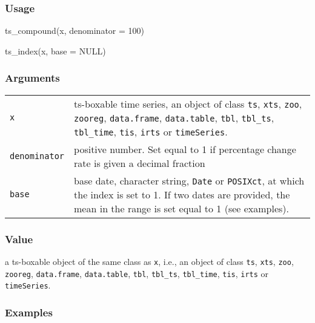 \documentclass[
  letterpaper,
  DIV=11,
  numbers=noendperiod]{scrreport}
\newenvironment{Shaded}{\begin{snugshade}}{\end{snugshade}}
\newcommand{\AttributeTok}[1]{\textcolor[rgb]{0.40,0.45,0.13}{#1}}
\newcommand{\ConstantTok}[1]{\textcolor[rgb]{0.56,0.35,0.01}{#1}}
\newcommand{\DecValTok}[1]{\textcolor[rgb]{0.68,0.00,0.00}{#1}}
\newcommand{\FunctionTok}[1]{\textcolor[rgb]{0.28,0.35,0.67}{#1}}
\newcommand{\NormalTok}[1]{\textcolor[rgb]{0.00,0.23,0.31}{#1}}
\begin{document}
\subsubsection{Usage}\label{usage-35}

\begin{Shaded}
\begin{Highlighting}[]
\FunctionTok{ts\_compound}\NormalTok{(x, }\AttributeTok{denominator =} \DecValTok{100}\NormalTok{)}

\FunctionTok{ts\_index}\NormalTok{(x, }\AttributeTok{base =} \ConstantTok{NULL}\NormalTok{)}
\end{Highlighting}
\end{Shaded}

\subsubsection{Arguments}\label{arguments-35}

\begin{longtable}[]{@{}ll@{}}
\toprule\noalign{}
\endhead
\bottomrule\noalign{}
\endlastfoot
\texttt{x} & ts-boxable time series, an object of class \texttt{ts},
\texttt{xts}, \texttt{zoo}, \texttt{zooreg}, \texttt{data.frame},
\texttt{data.table}, \texttt{tbl}, \texttt{tbl\_ts}, \texttt{tbl\_time},
\texttt{tis}, \texttt{irts} or \texttt{timeSeries}. \\
\texttt{denominator} & positive number. Set equal to 1 if percentage
change rate is given a decimal fraction \\
\texttt{base} & base date, character string, \texttt{Date} or
\texttt{POSIXct}, at which the index is set to 1. If two dates are
provided, the mean in the range is set equal to 1 (see examples). \\
\end{longtable}

\subsubsection{Value}\label{value-35}

a ts-boxable object of the same class as \texttt{x}, i.e., an object of
class \texttt{ts}, \texttt{xts}, \texttt{zoo}, \texttt{zooreg},
\texttt{data.frame}, \texttt{data.table}, \texttt{tbl},
\texttt{tbl\_ts}, \texttt{tbl\_time}, \texttt{tis}, \texttt{irts} or
\texttt{timeSeries}.

\subsubsection{Examples}\label{examples-35}
\end{document}
